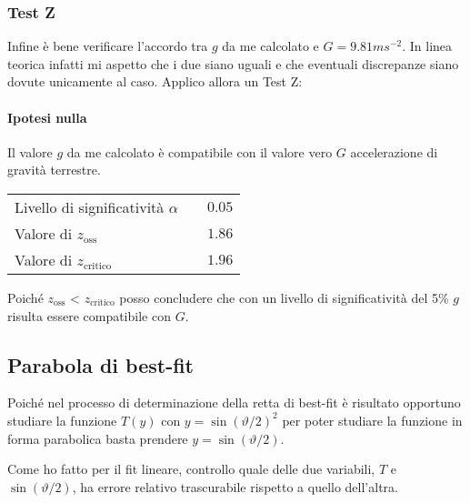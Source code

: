 \documentclass{article}
\begin{document}
\subsubsection{Test Z}
Infine è bene verificare l'accordo tra $g$ da me calcolato e $G = 9.81 ms^{-2}$. In linea teorica infatti mi aspetto che i due siano uguali e che eventuali discrepanze siano dovute unicamente al caso. Applico allora un Test Z:

\paragraph{Ipotesi nulla} Il valore $g$ da me calcolato è compatibile con il valore vero $G$ accelerazione di gravità terrestre.

\vspace{0.7cm}
\begin{table}[H]
	\centering
	\begin{tabular}{lr}
		Livello di significatività $\alpha$	& $\quad 0.05$  \\
		Valore di $z_\text{oss}$             	& $\quad 1.86$  \\
		Valore di $z_{\text{critico}}$ 		& $\quad 1.96$  \\ 
	\end{tabular}
\end{table}
\vspace{0.7cm}

\noindent
Poiché $z_\text{oss}$ < $z_{\text{critico}}$ posso concludere che con un livello di significatività del 5\% $g$ risulta essere compatibile con $G$.


\newpage
\subsection{Parabola di best-fit}
Poiché nel processo di determinazione della retta di best-fit è risultato opportuno studiare la funzione $T(y)$ con $y = \sin{\left( \vartheta / 2\right)}^2$ per poter studiare la funzione in forma parabolica basta prendere $y =  \sin{\left( \vartheta / 2\right)}$.

Come ho fatto per il fit lineare, controllo quale delle due variabili, $T$ e $ \sin{\left( \vartheta / 2\right)}$, ha errore relativo trascurabile rispetto a quello dell'altra.
\end{document}
